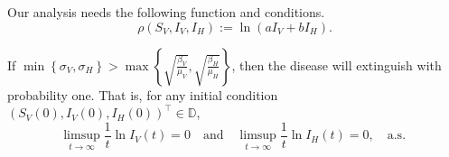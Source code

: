 Our analysis needs the following function and conditions.
\begin{equation}
    \rho (S_V, I_V, I_H) := \ln (a I_V + b I_H) .
\end{equation}

\begin{theorem}
        If 
        $
            \displaystyle
            \min
                \left \{
                      \sigma_V, \sigma_H 
                \right\} 
                > 
            \max 
                \left \{
                    \sqrt{\frac{\beta_V}{\mu_V}},
                    \sqrt{\frac{\beta_H}{\mu_H}}
                \right \}
        $,
        then the disease will extinguish with probability one.  That is,
        for any initial condition 
        $(S_V(0), I_V(0), I_H(0)) ^{\top} \in \mathbb{D}$,
        $$
            \limsup_{t \to \infty} 
                \frac{1}{t} \ln I_V(t) = 0 
                \quad \text{and} \quad
            \limsup_{t \to \infty} 
                \frac{1}{t} \ln I_H(t) = 0, \quad 
                \text{
                   a.s.
                }
        $$
\end{theorem}        
